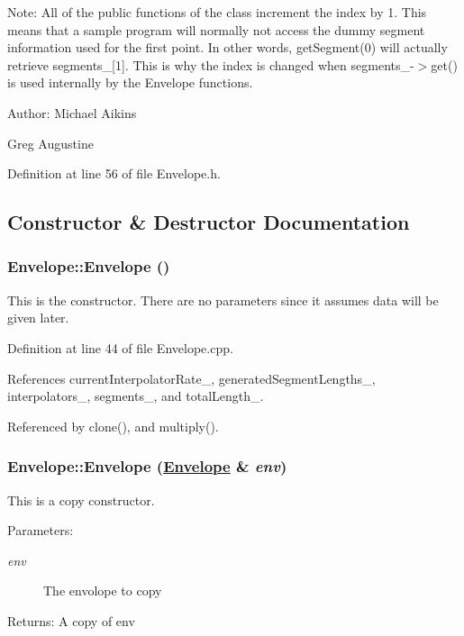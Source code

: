 \begin{Desc}
\item[Note:]All of the public functions of the class increment the index by 1. This means that a sample program will normally not access the dummy segment information used for the first point. In other words, get\-Segment(0) will actually retrieve segments\_\-\mbox{[}1\mbox{]}. This is why the index is changed when segments\_\--$>$get() is used internally by the Envelope functions.\end{Desc}
\begin{Desc}
\item[Author:]Michael Aikins 

Greg Augustine \end{Desc}




Definition at line 56 of file Envelope.h.

\subsection{Constructor \& Destructor Documentation}
\hypertarget{classEnvelope_a0}{
\subsubsection[Envelope]{\setlength{\rightskip}{0pt plus 5cm}Envelope::Envelope ()}}
\label{classEnvelope_a0}


This is the constructor. There are no parameters since it assumes data will be given later. 

Definition at line 44 of file Envelope.cpp.

References current\-Interpolator\-Rate\_\-, generated\-Segment\-Lengths\_\-, interpolators\_\-, segments\_\-, and total\-Length\_\-.

Referenced by clone(), and multiply().\hypertarget{classEnvelope_a1}{
\subsubsection[Envelope]{\setlength{\rightskip}{0pt plus 5cm}Envelope::Envelope (\hyperlink{classEnvelope}{Envelope} \& {\em env})}}
\label{classEnvelope_a1}


This is a copy constructor. \begin{Desc}
\item[Parameters:]
\begin{description}
\item[{\em env}]The envolope to copy \end{description}
\end{Desc}
\begin{Desc}
\item[Returns:]A copy of env \end{Desc}


